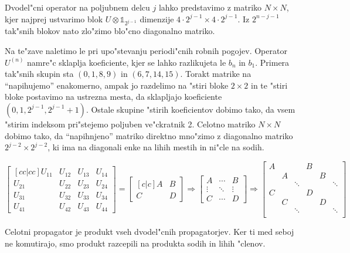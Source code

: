 \documentclass[a4paper,10pt]{article}
\begin{document}
Dvodel"cni operator na poljubnem delcu $j$ lahko predstavimo z matriko $N\times N$, kjer najprej ustvarimo blok $U \otimes \mathbb{1}_{2^{j-1}}$ dimenzije $4\cdot 2^{j-1}\times 4\cdot 2^{j-1}$. Iz $2^{n-j-1}$ tak"snih blokov nato zlo"zimo blo"cno diagonalno matriko. 

Na te"zave naletimo le pri upo"stevanju periodi"cnih robnih pogojev. Operator $U^{(n)}$ namre"c sklaplja koeficiente, kjer se lahko razlikujeta le $b_n$ in $b_1$. Primera tak"snih skupin sta $(0, 1, 8, 9)$ in $(6, 7, 14, 15)$. Torakt matrike na ``napihujemo'' enakomerno, ampak jo razdelimo na "stiri bloke $2\times 2$ in te "stiri bloke postavimo na ustrezna mesta, da sklapljajo koeficiente $(0, 1, 2^{j-1}, 2^{j-1}+1)$. Ostale skupine "stirih koeficientov dobimo tako, da vsem "stirim indeksom pri"stejemo poljuben ve"ckratnik 2. Celotno matriko $N\times N$ dobimo tako, da ``napihnjeno'' matriko direktno mno"zimo z diagonalno matriko $2^{j-2}\times 2^{j-2}$, ki ima na diagonali enke na lihih mestih in ni"cle na sodih. 

\begin{equation}
 \begin{bmatrix}[cc|cc]
  U_{11} & U_{12} & U_{13} & U_{14} \\
  U_{21} & U_{22} & U_{23} & U_{24} \\
  \hline
  U_{31} & U_{32} & U_{33} & U_{34} \\
  U_{41} & U_{42} & U_{43} & U_{44}
  \end{bmatrix} = \begin{bmatrix}[c|c]
  A & B \\
  \hline
  C & D
 \end{bmatrix} \Rightarrow \begin{bmatrix}
  A & \cdots & B \\
  \vdots & \ddots & \vdots \\
  C & \cdots & D
  \end{bmatrix} \Rightarrow \begin{bmatrix}
  A & & & B & & \\
  & A & & & B & \\
  & & \ddots & & & \ddots \\
  C & & & D & & \\
  & C & & & D & \\
  & & \ddots & & & \ddots \\
  \end{bmatrix}
\end{equation}

Celotni propagator je produkt vseh dvodel"cnih propagatorjev. Ker ti med seboj ne komutirajo, smo produkt razcepili na produkta sodih in lihih "clenov. 
\end{document}
